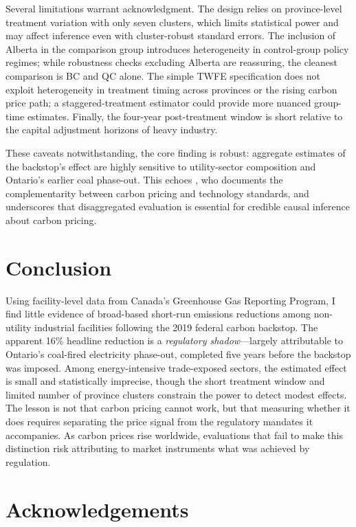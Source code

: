 \documentclass[12pt]{article}
\begin{document}
Several limitations warrant acknowledgment. The design relies on province-level treatment variation with only seven clusters, which limits statistical power and may affect inference even with cluster-robust standard errors. The inclusion of Alberta in the comparison group introduces heterogeneity in control-group policy regimes; while robustness checks excluding Alberta are reassuring, the cleanest comparison is BC and QC alone. The simple TWFE specification does not exploit heterogeneity in treatment timing across provinces or the rising carbon price path; a staggered-treatment estimator \citep{callaway_santanna_2021} could provide more nuanced group-time estimates. Finally, the four-year post-treatment window is short relative to the capital adjustment horizons of heavy industry.

These caveats notwithstanding, the core finding is robust: aggregate estimates of the backstop's effect are highly sensitive to utility-sector composition and Ontario's earlier coal phase-out. This echoes \citet{fowlie_2010}, who documents the complementarity between carbon pricing and technology standards, and underscores that disaggregated evaluation is essential for credible causal inference about carbon pricing.


\section{Conclusion}

Using facility-level data from Canada's Greenhouse Gas Reporting Program, I find little evidence of broad-based short-run emissions reductions among non-utility industrial facilities following the 2019 federal carbon backstop. The apparent 16\% headline reduction is a \textit{regulatory shadow}---largely attributable to Ontario's coal-fired electricity phase-out, completed five years before the backstop was imposed. Among energy-intensive trade-exposed sectors, the estimated effect is small and statistically imprecise, though the short treatment window and limited number of province clusters constrain the power to detect modest effects. The lesson is not that carbon pricing cannot work, but that measuring whether it does requires separating the price signal from the regulatory mandates it accompanies. As carbon prices rise worldwide, evaluations that fail to make this distinction risk attributing to market instruments what was achieved by regulation.

\section*{Acknowledgements}
\end{document}
